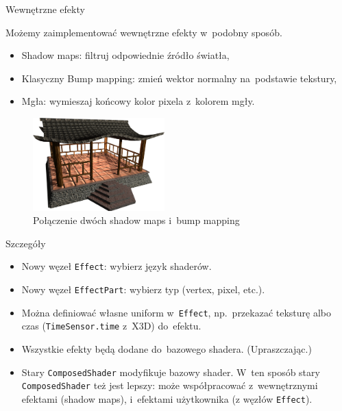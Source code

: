 \documentclass{beamer}
\begin{document}
\begin{frame}{Wewnętrzne efekty}

Możemy zaimplementować wewnętrzne efekty w~podobny sposób.

\begin{itemize}
  \item Shadow maps: filtruj odpowiednie źródło światła,
  \item Klasyczny Bump mapping: zmień wektor normalny na~podstawie tekstury,
  \item Mgła: wymieszaj końcowy kolor pixela z~kolorem mgły.
\end{itemize}

\begin{figure}
  \centering
  \includegraphics[width=2in]{../rhan_shrine_5_everything}
  \caption{Połączenie dwóch shadow maps i~bump mapping}
\end{figure}
\end{frame}

\begin{frame}{Szczegóły}
\begin{itemize}
  \item Nowy węzeł \texttt{Effect}: wybierz język shaderów.
  \item Nowy węzeł \texttt{EffectPart}: wybierz typ (vertex, pixel, etc.).
  \item Można definiować własne uniform w~\texttt{Effect}, np.~przekazać
    teksturę albo czas (\texttt{TimeSensor.time} z~X3D) do~efektu.
  \item Wszystkie efekty będą dodane do~bazowego shadera. (Upraszczając.)
  \item Stary \texttt{ComposedShader} modyfikuje bazowy shader.
    W~ten sposób stary \texttt{ComposedShader} też jest lepszy:
    może współpracować z~wewnętrznymi efektami (shadow maps),
    i~efektami użytkownika (z węzłów \texttt{Effect}).
\end{itemize}
\end{frame}
\end{document}
